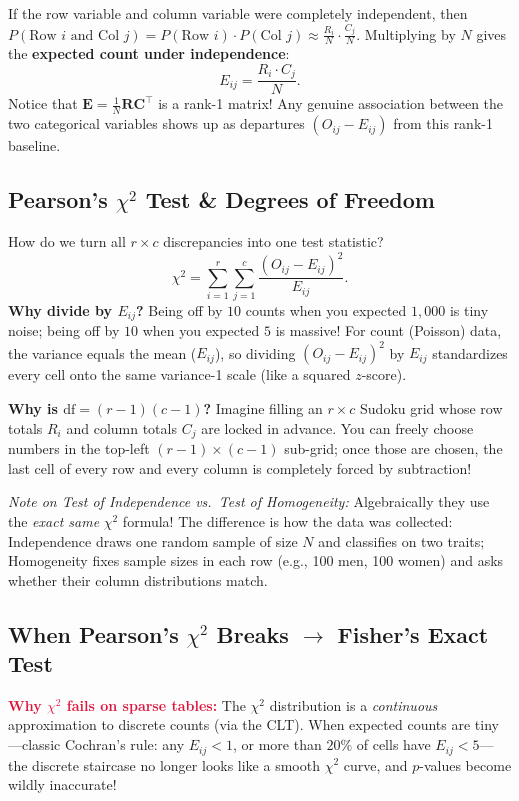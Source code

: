 \documentclass[11pt, a4paper]{article}
\begin{document}
If the row variable and column variable were completely independent, then $P(\text{Row } i \text{ and Col } j) = P(\text{Row } i) \cdot P(\text{Col } j) \approx \frac{R_i}{N} \cdot \frac{C_j}{N}$. Multiplying by $N$ gives the \textbf{expected count under independence}:
\[
    E_{ij} = \frac{R_i \cdot C_j}{N}.
\]
Notice that $\mathbf{E} = \frac{1}{N} \mathbf{R}\mathbf{C}^\top$ is a rank-1 matrix! Any genuine association between the two categorical variables shows up as departures $(O_{ij} - E_{ij})$ from this rank-1 baseline.

\subsection{Pearson's $\chi^2$ Test \& Degrees of Freedom}
How do we turn all $r \times c$ discrepancies into one test statistic?
\[
    \chi^2 = \sum_{i=1}^r \sum_{j=1}^c \frac{(O_{ij} - E_{ij})^2}{E_{ij}}.
\]
\textbf{Why divide by $E_{ij}$?} Being off by $10$ counts when you expected $1{,}000$ is tiny noise; being off by $10$ when you expected $5$ is massive! For count (Poisson) data, the variance equals the mean ($E_{ij}$), so dividing $(O_{ij} - E_{ij})^2$ by $E_{ij}$ standardizes every cell onto the same variance-1 scale (like a squared $z$-score).

\textbf{Why is $\text{df} = (r-1)(c-1)$?} Imagine filling an $r \times c$ Sudoku grid whose row totals $R_i$ and column totals $C_j$ are locked in advance. You can freely choose numbers in the top-left $(r-1) \times (c-1)$ sub-grid; once those are chosen, the last cell of every row and every column is completely forced by subtraction!

\emph{Note on Test of Independence vs.\ Test of Homogeneity:} Algebraically they use the \emph{exact same} $\chi^2$ formula! The difference is how the data was collected: Independence draws one random sample of size $N$ and classifies on two traits; Homogeneity fixes sample sizes in each row (e.g., 100 men, 100 women) and asks whether their column distributions match.

\subsection{When Pearson's $\chi^2$ Breaks $\longrightarrow$ Fisher's Exact Test}
\textcolor{crimson}{\textbf{Why $\chi^2$ fails on sparse tables:}} The $\chi^2$ distribution is a \emph{continuous} approximation to discrete counts (via the CLT). When expected counts are tiny---classic Cochran's rule: any $E_{ij} < 1$, or more than $20\%$ of cells have $E_{ij} < 5$---the discrete staircase no longer looks like a smooth $\chi^2$ curve, and $p$-values become wildly inaccurate!
\end{document}
